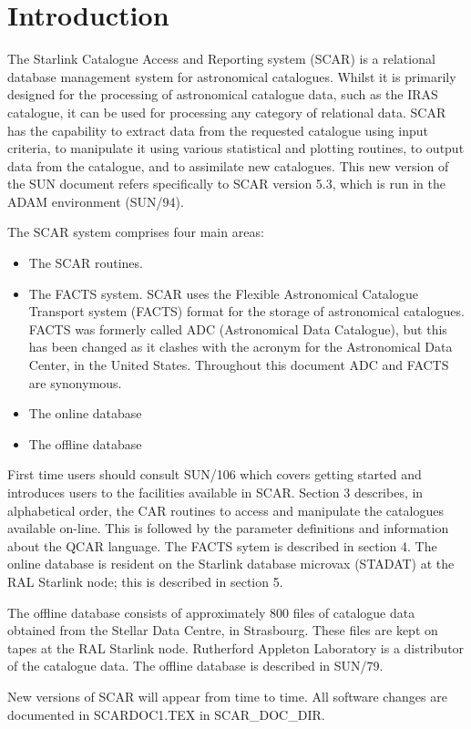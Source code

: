 \section {Introduction}

The Starlink Catalogue Access and Reporting system (SCAR) is a relational
database management system for astronomical catalogues.
Whilst it is primarily designed for the processing of astronomical catalogue
data, such as the IRAS catalogue, it can be used for processing any category of
relational data.
SCAR has the capability to extract data from the requested catalogue using input
criteria, to manipulate it using various statistical and plotting routines,
to output data from the catalogue, and to assimilate new catalogues.
This new version of the SUN document refers specifically to SCAR version 5.3,
which is run in the ADAM environment (SUN/94).

The SCAR system comprises four main areas:
\begin{itemize}
\item The SCAR routines.
\item The FACTS system. SCAR uses the Flexible Astronomical Catalogue Transport
system (FACTS) format for the storage of astronomical catalogues.
FACTS was formerly called ADC (Astronomical Data Catalogue), but this has been
changed as it clashes with the acronym for the Astronomical Data Center, in
the United States.
Throughout this document ADC and FACTS are synonymous.
\item The online database
\item The offline database
\end{itemize}
First time users should consult SUN/106 which covers getting started and 
introduces users to the facilities available in SCAR.
Section 3 describes, in alphabetical order, the CAR routines to access and 
manipulate the catalogues available on-line. This is followed by the parameter
definitions
and information about the QCAR language.
The FACTS sytem is described in section 4.
The online database is resident on the Starlink database microvax (STADAT)
at the RAL Starlink node; this is described in section 5.

The offline database consists of approximately 800 files of catalogue data
obtained from the Stellar Data Centre, in Strasbourg.
These files are kept on tapes at the RAL Starlink node.
Rutherford Appleton Laboratory is a distributor of the catalogue data.
The offline database is described in SUN/79.

New versions of SCAR will appear from time to time.
All software changes are documented in SCARDOC1.TEX in SCAR\_DOC\_DIR.

